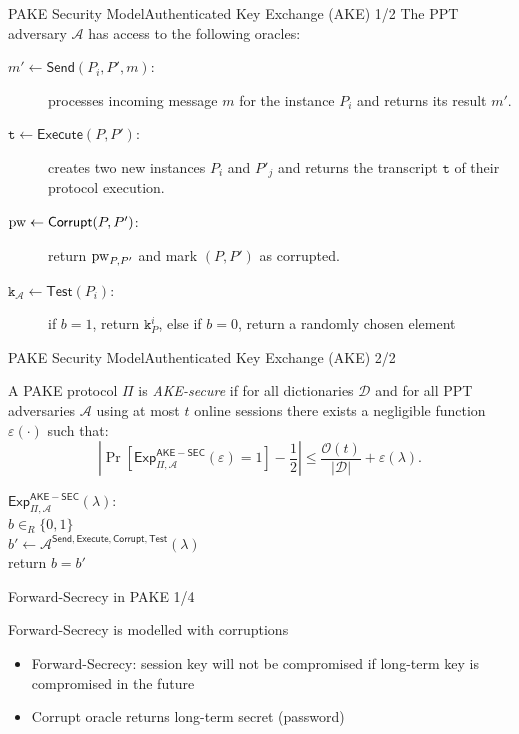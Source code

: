 \documentclass[notes,xcolor=dvipsnames]{beamer}
\begin{document}
\begin{frame}{PAKE Security Model}{Authenticated Key Exchange (AKE) 1/2}
The PPT adversary $\mathcal{A}$ has access to the following oracles:
\begin{description}
    \item[$m'\gets\mathsf{Send}(P_i,P',m)$:] processes incoming message $m$ for the instance $P_i$ and returns its result $m'$.
    \item[$\mathtt{t}\gets\mathsf{Execute}(P,P')$:] creates two new instances $P_i$ and $P'_j$ and returns the transcript $\mathtt{t}$ of their protocol execution.
    \item[$\mathrm{pw}\gets\mathsf{Corrupt}(P, P')$:] return $\mathrm{pw}_{P,P'}$ and mark $(P,P')$ as corrupted.
    \item[$\mathtt{k}_\mathcal{A}\gets\mathsf{Test}(P_i)$:] if $b=1$, return $\mathtt{k}^i_P$, else if $b=0$, return a randomly chosen element
\end{description}
\end{frame}

\begin{frame}{PAKE Security Model}{Authenticated Key Exchange (AKE) 2/2}
\begin{definition}\label{def:ake}
A PAKE protocol $\Pi$ is \emph{AKE-secure} if for all dictionaries $\mathcal{D}$ and for all PPT adversaries $\mathcal{A}$ using at most $t$ online sessions there exists a negligible function $\varepsilon(\cdot)$ such that:
\[\left|\Pr[\mathsf{Exp}_{\Pi,\mathcal{A}}^{\mathsf{AKE-SEC}}(\varepsilon)=1]-\frac12\right|\leq \frac{\mathcal{O}(t)}{|\mathcal{D}|}+\varepsilon(\lambda).\]

\noindent$\mathsf{Exp}_{\Pi,\mathcal{A}}^{\mathsf{AKE-SEC}}(\lambda):$ \\
\hspace*{2em} $b\in_R\{0,1\}$\\
\hspace*{2em} $b'\gets\mathcal{A}^{\mathsf{Send},\mathsf{Execute},\mathsf{Corrupt},\mathsf{Test}}(\lambda)$\\
\hspace*{2em} return $b=b'$
\end{definition}
\end{frame}

\begin{frame}{Forward-Secrecy in PAKE 1/4}{}

	Forward-Secrecy is modelled with corruptions
	\begin{itemize}
		\item Forward-Secrecy: session key will not be compromised if long-term key is compromised in the future
		\item Corrupt oracle returns long-term secret (password)
	\end{itemize}

\end{frame}
\end{document}
